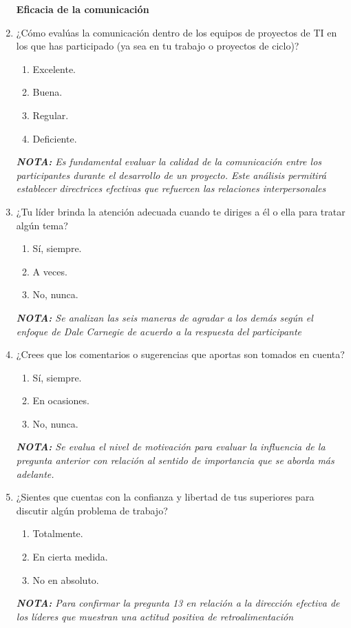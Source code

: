 \documentclass[journal]{IEEEtran}
\begin{document}
\begin{enumerate}
	
	\begin{center}
		\textbf{Eficacia de la comunicación}
	\end{center}
	
	\item ¿Cómo evalúas la comunicación dentro de los equipos de proyectos de TI en los que has participado (ya sea en tu trabajo o proyectos de ciclo)?
	\begin{enumerate}
		\item Excelente.
		\item Buena.
		\item Regular.
		\item Deficiente.
	\end{enumerate}
	\textit{\textbf{NOTA:} Es fundamental evaluar la calidad de la comunicación entre los participantes durante el desarrollo de un proyecto. Este análisis permitirá establecer directrices efectivas que refuercen las relaciones interpersonales}
	
	\item ¿Tu líder brinda la atención adecuada cuando te diriges a él o ella para tratar algún tema?
	\begin{enumerate}
		\item Sí, siempre.
		\item A veces.
		\item No, nunca.
	\end{enumerate}
	\textit{\textbf{NOTA:} Se analizan las seis maneras de agradar a los demás según el enfoque de Dale Carnegie de acuerdo a la respuesta del participante}
	
	\item ¿Crees que los comentarios o sugerencias que aportas son tomados en cuenta?
	\begin{enumerate}
		\item Sí, siempre.
		\item En ocasiones.
		\item No, nunca.
	\end{enumerate}
	\textit{\textbf{NOTA:} Se evalua el nivel de motivación para evaluar la influencia de la pregunta anterior con relación al sentido de importancia que se aborda más adelante.}
	
	
	\item ¿Sientes que cuentas con la confianza y libertad de tus superiores para discutir algún problema de trabajo?
	\begin{enumerate}
		\item Totalmente.
		\item En cierta medida.
		\item No en absoluto.
	\end{enumerate}
	\textit{\textbf{NOTA:} Para confirmar la pregunta 13 en relación a la dirección efectiva de los líderes que muestran una actitud positiva de retroalimentación}
	

\end{enumerate}
\end{document}
